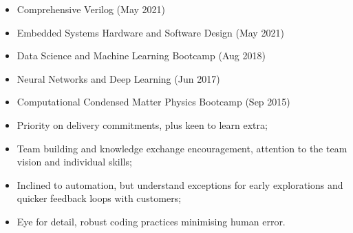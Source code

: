 \documentclass[10pt,a4paper,ragged2e,withhyper]{altacv}
\begin{document}
\begin{paracol}{2}
\begin{itemize}
    \item Comprehensive Verilog (May 2021)
    
    \item Embedded Systems Hardware and Software Design (May 2021)
    
    \item Data Science and Machine Learning Bootcamp (Aug 2018)
    
    \item Neural Networks and Deep Learning (Jun 2017)
    
    \item Computational Condensed Matter Physics Bootcamp (Sep 2015)
\end{itemize}



\begin{itemize}
    \item Priority on delivery commitments, plus keen to learn extra;

    \item Team building and knowledge exchange encouragement,
    attention to the team vision and individual skills;

    \item Inclined to automation, but understand exceptions for
    early explorations and quicker feedback loops with customers;
    
    \item Eye for detail, robust coding practices minimising human error.
\end{itemize}



\end{paracol}
\end{document}
